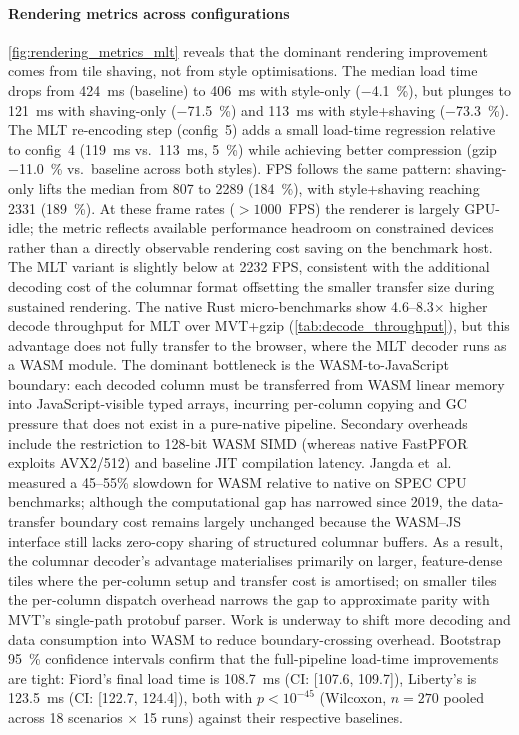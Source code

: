 \paragraph{Rendering metrics across configurations}
\cref{fig:rendering_metrics_mlt} reveals that the dominant rendering improvement comes from tile shaving, not from style optimisations.
The median load time drops from \qty{424}{\milli\second} (baseline) to \qty{406}{\milli\second} with style-only (\qty{-4.1}{\percent}), but plunges to \qty{121}{\milli\second} with shaving-only (\qty{-71.5}{\percent}) and \qty{113}{\milli\second} with style+shaving (\qty{-73.3}{\percent}).
The \ac{MLT} re-encoding step (config~5) adds a small load-time regression relative to config~4 (\qty{119}{\milli\second} vs.\ \qty{113}{\milli\second}, \qty{+5}{\percent}) while achieving better compression (gzip \qty{-11.0}{\percent} vs.\ baseline across both styles).
\ac{FPS} follows the same pattern: shaving-only lifts the median from 807 to \num{2289} (\qty{+184}{\percent}), with style+shaving reaching \num{2331} (\qty{+189}{\percent}).
At these frame rates ($>{1000}$~FPS) the renderer is largely GPU-idle; the metric reflects available performance headroom on constrained devices rather than a directly observable rendering cost saving on the benchmark host.
The \ac{MLT} variant is slightly below at \num{2232} \ac{FPS}, consistent with the additional decoding cost of the columnar format offsetting the smaller transfer size during sustained rendering.
The native Rust micro-benchmarks show \numrange{4.6}{8.3}$\times$ higher decode throughput for \ac{MLT} over \ac{MVT}+gzip (\cref{tab:decode_throughput}), but this advantage does not fully transfer to the browser, where the \ac{MLT} decoder runs as a WASM module.
The dominant bottleneck is the WASM-to-JavaScript boundary: each decoded column must be transferred from WASM linear memory into JavaScript-visible typed arrays, incurring per-column copying and GC pressure that does not exist in a pure-native pipeline.
Secondary overheads include the restriction to 128-bit WASM SIMD (whereas native \ac{FastPFOR} exploits AVX2/512) and baseline JIT compilation latency.
Jangda et~al.~\cite{jangdaNotSoFast2019} measured a 45--55\% slowdown for WASM relative to native on SPEC CPU benchmarks; although the computational gap has narrowed since 2019, the data-transfer boundary cost remains largely unchanged because the WASM--JS interface still lacks zero-copy sharing of structured columnar buffers.
As a result, the columnar decoder's advantage materialises primarily on larger, feature-dense tiles where the per-column setup and transfer cost is amortised; on smaller tiles the per-column dispatch overhead narrows the gap to approximate parity with \ac{MVT}'s single-path protobuf parser.
Work is underway to shift more decoding and data consumption into WASM to reduce boundary-crossing overhead.
Bootstrap \qty{95}{\percent} confidence intervals confirm that the full-pipeline load-time improvements are tight: Fiord's final load time is \qty{108.7}{\milli\second} (CI: [\num{107.6}, \num{109.7}]), Liberty's is \qty{123.5}{\milli\second} (CI: [\num{122.7}, \num{124.4}]), both with $p < 10^{-45}$ (Wilcoxon, $n = 270$ pooled across 18 scenarios $\times$ 15 runs) against their respective baselines.

